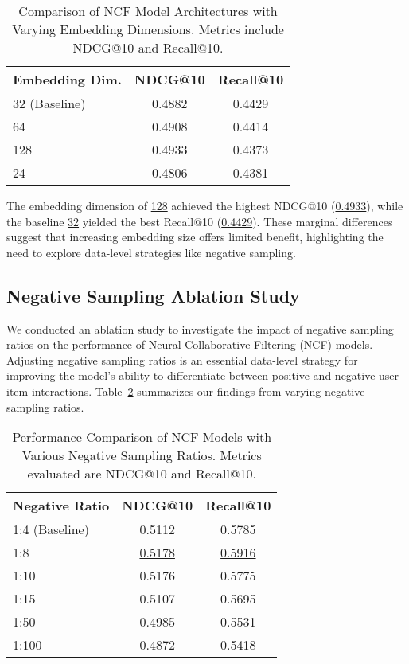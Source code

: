 \documentclass[runningheads]{llncs}
\begin{document}
\begin{table}[h!]
\centering
\caption{Comparison of NCF Model Architectures with Varying Embedding Dimensions. Metrics include NDCG@10 and Recall@10.}
\label{tab:results}
\begin{tabular}{lcc}
\toprule
\textbf{Embedding Dim.} & \textbf{NDCG@10} & \textbf{Recall@10} \\
\midrule
32 (Baseline) & 0.4882 & 0.4429 \\
64 & 0.4908 & 0.4414 \\
128 & 0.4933 & 0.4373 \\
24 & 0.4806 & 0.4381 \\
\bottomrule
\end{tabular}
\end{table}

The embedding dimension of \underline{128} achieved the highest NDCG@10 (\underline{0.4933}), while the baseline \underline{32} yielded the best Recall@10 (\underline{0.4429}). These marginal differences suggest that increasing embedding size offers limited benefit, highlighting the need to explore data-level strategies like negative sampling.

\subsection{Negative Sampling Ablation Study}

We conducted an ablation study to investigate the impact of negative sampling ratios on the performance of Neural Collaborative Filtering (NCF) models. Adjusting negative sampling ratios is an essential data-level strategy for improving the model's ability to differentiate between positive and negative user-item interactions. Table~\ref{tab:negative_sampling_results} summarizes our findings from varying negative sampling ratios.

\begin{table}[h!]
\centering
\caption{Performance Comparison of NCF Models with Various Negative Sampling Ratios. Metrics evaluated are NDCG@10 and Recall@10.}
\label{tab:negative_sampling_results}
\begin{tabular}{lcc}
\toprule
\textbf{Negative Ratio} & \textbf{NDCG@10} & \textbf{Recall@10} \\
\midrule
1:4 (Baseline) & 0.5112 & 0.5785 \\
1:8 & \underline{0.5178} & \underline{0.5916} \\
1:10 & 0.5176 & 0.5775 \\
1:15 & 0.5107 & 0.5695 \\
1:50 & 0.4985 & 0.5531 \\
1:100 & 0.4872 & 0.5418 \\
\bottomrule
\end{tabular}
\end{table}
\end{document}
